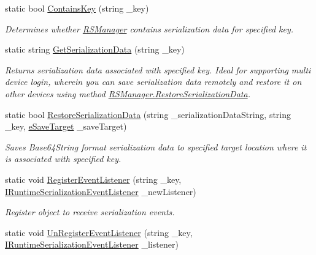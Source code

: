\begin{DoxyCompactItemize}
static bool \hyperlink{class_r_s_manager_a1a5c88e07167dfd4b9bd0293c871cccb}{Contains\+Key} (string \+\_\+key)
\begin{DoxyCompactList}\small\item\em Determines whether \hyperlink{class_r_s_manager}{R\+S\+Manager} contains serialization data for specified key. \end{DoxyCompactList}\item 
static string \hyperlink{class_r_s_manager_ad0da99fc39195b85481e5b1a94b6e451}{Get\+Serialization\+Data} (string \+\_\+key)
\begin{DoxyCompactList}\small\item\em Returns serialization data associated with specified key. Ideal for supporting multi device login, wherein you can save serialization data remotely and restore it on other devices using method \hyperlink{class_r_s_manager_afa6f7bc8fae802b923bc090b60f7a92f}{R\+S\+Manager.\+Restore\+Serialization\+Data}. \end{DoxyCompactList}\item 
static bool \hyperlink{class_r_s_manager_afa6f7bc8fae802b923bc090b60f7a92f}{Restore\+Serialization\+Data} (string \+\_\+serialization\+Data\+String, string \+\_\+key, \hyperlink{namespace_voxel_busters_1_1_runtime_serialization_aacaa3008b2cb441fbe4708df854019bf}{e\+Save\+Target} \+\_\+save\+Target)
\begin{DoxyCompactList}\small\item\em Saves Base64\+String format serialization data to specified target location where it is associated with specified key. \end{DoxyCompactList}\item 
static void \hyperlink{class_r_s_manager_aec7a89a1be1d258f23edf4a9018d312a}{Register\+Event\+Listener} (string \+\_\+key, \hyperlink{interface_voxel_busters_1_1_runtime_serialization_1_1_i_runtime_serialization_event_listener}{I\+Runtime\+Serialization\+Event\+Listener} \+\_\+new\+Listener)
\begin{DoxyCompactList}\small\item\em Register object to receive serialization events. \end{DoxyCompactList}\item 
static void \hyperlink{class_r_s_manager_a47c28044983d7a3dcb729c8a40f0f0f9}{Un\+Register\+Event\+Listener} (string \+\_\+key, \hyperlink{interface_voxel_busters_1_1_runtime_serialization_1_1_i_runtime_serialization_event_listener}{I\+Runtime\+Serialization\+Event\+Listener} \+\_\+listener)

\end{DoxyCompactItemize}
